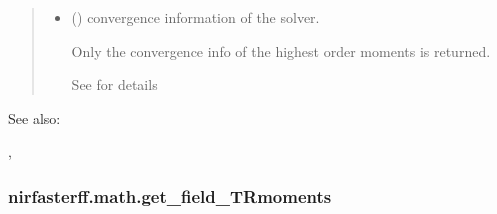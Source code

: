 \documentclass[letterpaper,10pt,english]{sphinxmanual}
\begin{document}
\begin{fulllineitems}
\begin{quote}
\begin{description}
\begin{itemize}
\item {} 
\sphinxAtStartPar
{} () \textendash{} convergence information of the solver.

\sphinxAtStartPar
Only the convergence info of the highest order moments is returned.

\sphinxAtStartPar
See {\hyperref[\detokenize{_autosummary/nirfasterff.utils.ConvergenceInfo:nirfasterff.utils.ConvergenceInfo}]{}} for details

\end{itemize}


\end{description}\end{quote}


\begin{sphinxseealso}{See also:}

\sphinxAtStartPar
{\hyperref[\detokenize{_autosummary/nirfasterff.math.gen_mass_matrix:nirfasterff.math.gen_mass_matrix}]{}}, {\hyperref[\detokenize{_autosummary/nirfasterff.math.get_field_TRmoments:nirfasterff.math.get_field_TRmoments}]{}}


\end{sphinxseealso}


\end{fulllineitems}


\sphinxstepscope


\subsubsection{nirfasterff.math.get\_field\_TRmoments}
\label{\detokenize{_autosummary/nirfasterff.math.get_field_TRmoments:nirfasterff-math-get-field-trmoments}}\label{\detokenize{_autosummary/nirfasterff.math.get_field_TRmoments::doc}}
\end{document}
